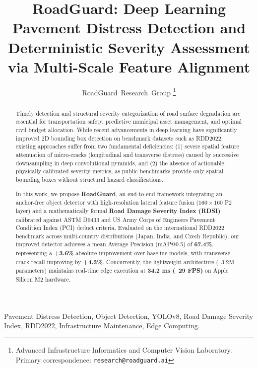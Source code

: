 \documentclass[journal,10pt]{IEEEtran}
\begin{document}
\title{RoadGuard: Deep Learning Pavement Distress Detection and Deterministic Severity Assessment via Multi-Scale Feature Alignment}

\author{RoadGuard~Research~Group%
\thanks{Advanced Infrastructure Informatics and Computer Vision Laboratory. Primary correspondence: \texttt{research@roadguard.ai}}}

\maketitle

\begin{abstract}
Timely detection and structural severity categorization of road surface degradation are essential for transportation safety, predictive municipal asset management, and optimal civil budget allocation. While recent advancements in deep learning have significantly improved 2D bounding box detection on benchmark datasets such as RDD2022, existing approaches suffer from two fundamental deficiencies: (1) severe spatial feature attenuation of micro-cracks (longitudinal and transverse distress) caused by successive downsampling in deep convolutional pyramids, and (2) the absence of actionable, physically calibrated severity metrics, as public benchmarks provide only spatial bounding boxes without structural hazard classifications.

In this work, we propose \textbf{RoadGuard}, an end-to-end framework integrating an anchor-free object detector with high-resolution lateral feature fusion ($160 \times 160$ P2 layer) and a mathematically formal \textbf{Road Damage Severity Index (RDSI)} calibrated against ASTM D6433 and US Army Corps of Engineers Pavement Condition Index (PCI) deduct criteria. Evaluated on the international RDD2022 benchmark across multi-country distributions (Japan, India, and Czech Republic), our improved detector achieves a mean Average Precision (mAP@0.5) of \textbf{67.4\%}, representing a \textbf{+3.6\%} absolute improvement over baseline models, with transverse crack recall improving by \textbf{+4.3\%}. Concurrently, the lightweight architecture (~3.2M parameters) maintains real-time edge execution at \textbf{34.2 ms (~29 FPS)} on Apple Silicon M2 hardware.
\end{abstract}

\begin{IEEEkeywords}
Pavement Distress Detection, Object Detection, YOLOv8, Road Damage Severity Index, RDD2022, Infrastructure Maintenance, Edge Computing.
\end{IEEEkeywords}
\end{document}

